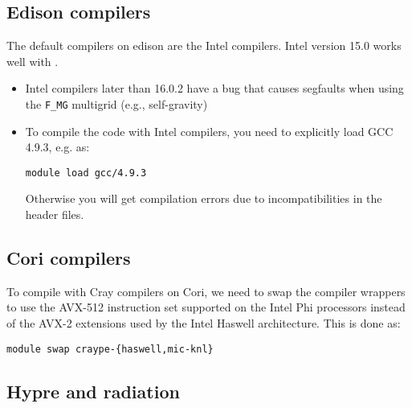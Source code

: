 

\subsection{Edison compilers}

The default compilers on edison are the Intel compilers.  Intel version 15.0
works well with \castro.

\begin{itemize}
\item Intel compilers later than 16.0.2 have a bug that causes segfaults when using the 
  {\tt F\_MG} multigrid (e.g., self-gravity)

\item To compile the code with Intel compilers, you need to explicitly load GCC 4.9.3,
e.g. as:
\begin{verbatim}
module load gcc/4.9.3
\end{verbatim}
Otherwise you will get compilation errors due to incompatibilities in the header files.
\end{itemize}


\subsection{Cori compilers}

To compile with Cray compilers on Cori, we need to swap the compiler
wrappers to use the AVX-512 instruction set supported on the Intel Phi
processors instead of the AVX-2 extensions used by the Intel Haswell
architecture.  This is done as:
\begin{verbatim}
module swap craype-{haswell,mic-knl}
\end{verbatim}


\subsection{Hypre and radiation}

